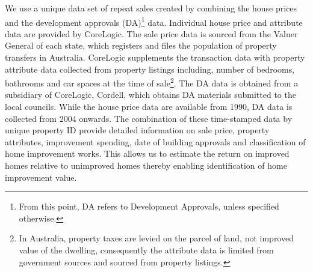 \documentclass[AEJ,reqno, draftmode]{AEA} %
\begin{document}
We use a unique data set of repeat sales created by combining the house prices and the development approvals (DA)\footnote{From this point, DA refers to Development Approvals, unless specified otherwise.} data. Individual house price and attribute data are provided by CoreLogic. The sale price data is sourced from the Valuer General of each state, which registers and files the population of property transfers in Australia. CoreLogic supplements the transaction data with property attribute data collected from property listings including, number of bedrooms, bathrooms and car spaces at the time of sale\footnote{In Australia, property taxes are levied on the parcel of land, not improved value of the dwelling, consequently the attribute data is limited from government sources and sourced from property listings.}. The DA data is obtained from a subsidiary of CoreLogic, Cordell, which obtains DA materials submitted to the local councils. While the house price data are available from 1990, DA data is collected from 2004 onwards. The combination of these time-stamped data by unique property ID provide detailed information on sale price, property attributes, improvement spending, date of building approvals and classification of home improvement works. This allows us to estimate the return on improved homes relative to unimproved homes thereby enabling identification of home improvement value.
\end{document}
